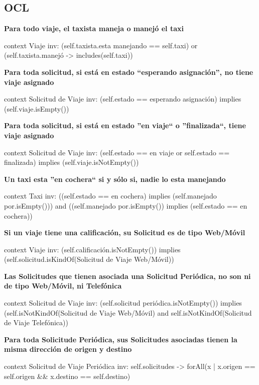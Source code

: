 \documentclass[a4paper, 10pt, twoside]{article}
\newenvironment{ocl}[1]
  {
    \textbf{#1}
    \verbatim
  }{
    \endverbatim
  }
\begin{document}
\subsection{OCL}

\begin{ocl}{Para todo viaje, el taxista maneja o manejó el taxi}
  context Viaje
  inv: (self.taxista.esta manejando == self.taxi) or
       (self.taxista.manejó -> includes(self.taxi)) 
\end{ocl}

\begin{ocl}{Para toda solicitud, si está en estado ``esperando asignación'', no tiene viaje asignado}
  context Solicitud de Viaje
  inv: (self.estado == esperando asignación) implies
       (self.viaje.isEmpty()) 
\end{ocl}

\begin{ocl}{Para toda solicitud, si está en estado ''en viaje`` o ''finalizada``, tiene viaje asignado}
  context Solicitud de Viaje
  inv: (self.estado == en viaje or self.estado == finalizada) implies
       (self.viaje.isNotEmpty()) 
\end{ocl}

\begin{ocl}{Un taxi esta ''en cochera`` si y sólo si, nadie lo esta manejando}
  context Taxi
  inv: ((self.estado == en cochera) implies (self.manejado por.isEmpty())) and
       ((self.manejado por.isEmpty()) implies (self.estado == en cochera))
\end{ocl}
 
\begin{ocl}{Si un viaje tiene una calificación, su Solicitud es de tipo Web/M\'ovil}
  context Viaje
  inv: (self.calificación.isNotEmpty()) implies
       (self.solicitud.isKindOf(Solicitud de Viaje Web/M\'ovil)) 
\end{ocl}
 
\begin{ocl}{Las Solicitudes que tienen asociada una Solicitud Periódica, no son ni de tipo Web/M\'ovil, ni Telef\'onica}
  context Solicitud de Viaje
  inv: (self.solicitud periódica.isNotEmpty()) implies
       (self.isNotKindOf(Solicitud de Viaje Web/M\'ovil) and self.isNotKindOf(Solicitud de Viaje Telefónica)) 
\end{ocl}
 
\begin{ocl}{Para toda Solicitude Periódica, sus Solicitudes asociadas tienen la misma dirección de origen y destino}
  context Solicitud de Viaje Periódica
  inv: self.solicitudes -> forAll(x | x.origen == self.origen && x.destino == self.destino) 
\end{ocl}
\end{document}
